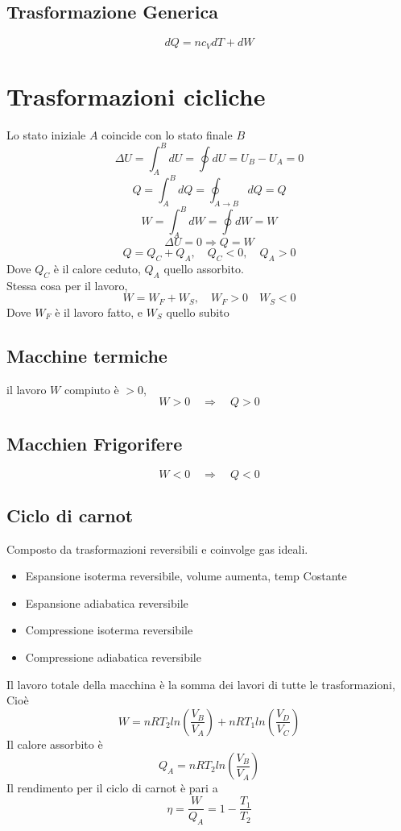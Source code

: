 \documentclass[a4paper]{report}
\begin{document}
  \subsection{Trasformazione Generica}
  $$ dQ = nc_V dT + dW $$

  \section{Trasformazioni cicliche}
  Lo stato iniziale $A$ coincide con lo stato finale $B$
  $$ \Delta U = \int_A^B dU = \oint dU = U_B - U_A = 0 $$
  $$ Q = \int_A^B dQ = \oint_{A \rightarrow B} dQ = Q $$
  $$ W = \int_A^B dW = \oint dW = W $$
  $$ \Delta U = 0 \Rightarrow Q = W $$
  $$ Q = Q_C + Q_A,  \quad Q_C < 0, \quad Q_A > 0 $$
  Dove $Q_C$ è il calore ceduto, $Q_A$ quello assorbito.\\
  Stessa cosa per il lavoro,
  $$ W = W_F + W_S, \quad W_F > 0  \quad W_S < 0 $$
  Dove $W_F$ è il lavoro fatto, e $W_S$ quello subito
  \subsection{Macchine termiche}
  il lavoro $W$ compiuto è $>0$,
  $$ W>0 \quad \Rightarrow \quad Q > 0 $$
  \subsection{Macchien Frigorifere}
  $$ W<0 \quad \Rightarrow \quad Q < 0 $$

  \subsection{Ciclo di carnot}
  Composto da trasformazioni reversibili e coinvolge gas ideali.\\
  \begin{itemize}
    \item Espansione isoterma reversibile, volume aumenta, temp Costante
    \item Espansione adiabatica reversibile
    \item Compressione isoterma reversibile
    \item Compressione adiabatica reversibile
  \end{itemize}
  Il lavoro totale della macchina è la somma dei lavori di tutte le trasformazioni, Cioè
  $$ W= nRT_2 ln (\frac{V_B}{V_A}) + nR T_1 ln (\frac{V_D}{V_C})$$
  Il calore assorbito è
  $$ Q_A = nRT_2 ln(\frac{V_B}{V_A})$$
  Il rendimento per il ciclo di carnot è pari a
  $$\eta = \frac{W}{Q_A} = 1 - \frac{T_1}{T_2}$$
\end{document}
